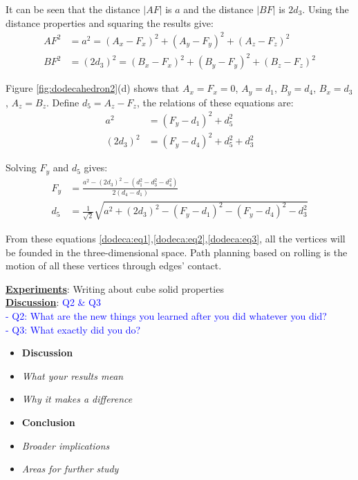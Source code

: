 It can be seen that the distance $|AF|$ is $a$ and the distance $|BF|$ is $2d_3$. Using the distance properties and squaring the results give:
\begin{equation} 
\label{dodeca:eq1}
\begin{split}
AF^2 & = a^2 = (A_x-F_x)^2 + (A_y-F_y)^2 + (A_z-F_z)^2 \\
BF^2 & = (2d_3)^2 = (B_x-F_x)^2 + (B_y-F_y)^2 + (B_z-F_z)^2
\end{split}
\end{equation}

Figure \ref{fig:dodecahedron2}(d) shows that $A_x = F_x = 0$, $A_y = d_1$, $B_y = d_4$, $B_x = d_3$, $A_z = B_z$. Define $d_5=A_z-F_z$, the relations of these equations are:
\begin{equation} 
\label{dodeca:eq2}
\begin{split}
a^2 & = (F_y-d_1)^2 + d_5^2\\
(2d_3)^2 & = (F_y-d_4)^2 + d_5^2 + d_3^2
\end{split}
\end{equation}

Solving $F_y$ and $d_5$ gives:
\begin{equation} 
\label{dodeca:eq3}
\begin{split}
F_y & = \frac{a^2-(2d_3)^2-(d_1^2-d_3^2-d_4^2)}{2(d_4-d_1)} \\
d_5 & = \frac{1}{\sqrt{2}}\sqrt{a^2+(2d_3)^2-(F_y-d_1)^2-(F_y-d_4)^2-d_3^2}
\end{split}
\end{equation}

From these equations \ref{dodeca:eq1},\ref{dodeca:eq2},\ref{dodeca:eq3}, all the vertices will be founded in the three-dimensional space. Path planning based on rolling is the motion of all these vertices through edges' contact.


\newpage
\noindent\uline{\textbf{Experiments}}:
Writing about cube solid properties\\

\noindent\uline{\textbf{Discussion}}: 
\textcolor{blue}{Q2 \& Q3\\
- Q2: What are the new things you learned after you did whatever you did?\\
- Q3: What exactly did you do?}\\

\begin{itemize}
\color{red}
\item \textbf{Discussion}
\item \textit{What your results mean}
\item \textit{Why it makes a difference}
\item \textbf{Conclusion}
\item \textit{Broader implications}
\item \textit{Areas for further study}
\end{itemize}





